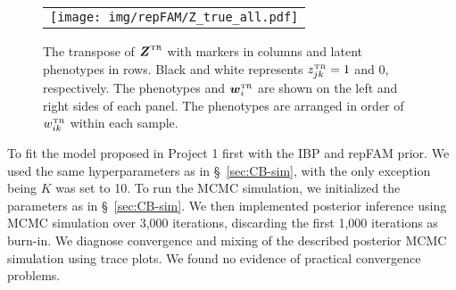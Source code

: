 \documentclass[12pt,]{article}
\newcommand{\true}{{\mbox{\tiny TR}}}
\newcommand{\bZ}{\mbox{\boldmath $Z$}}
\newcommand{\bw}{\mbox{\boldmath $w$}}
\begin{document}
\begin{figure}[t!]
  \begin{center}
\begin{tabular}{c}
\texttt{[image: img/repFAM/Z\_true\_all.pdf]}
  \end{tabular}
 \end{center}
 \vspace{-0.05in}
\caption{The transpose of $\bZ^\true$ with markers in columns and latent
phenotypes in rows. Black and white represents $z^\true_{jk}=1$ and 0,
respectively. The phenotypes and $\bw^\true_i$ are shown on the left and
right sides of each panel.  The phenotypes are arranged in order of
$w_{ik}^\true$ within each sample.}
\label{fig:repFAM-sim-Z}
\end{figure}

To fit the model proposed in Project 1 first with the IBP and repFAM prior. We
used the same hyperparameters as in \S~\ref{sec:CB-sim}, with the only
exception being $K$ was set to 10.
%
To run the MCMC simulation, we initialized the parameters as 
in \S~\ref{sec:CB-sim}.
%
We then implemented posterior inference using MCMC simulation over 3,000
iterations, discarding the first 1,000 iterations as burn-in.  We diagnose
convergence and mixing of the described posterior MCMC simulation using trace
plots. We found no evidence of practical convergence problems. 
\end{document}
